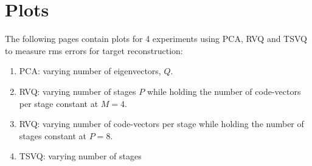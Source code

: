 \newpage
\appendix 
\section{Plots}
The following pages contain plots for 4 experiments using PCA, RVQ and TSVQ to measure rms errors for target reconstruction:

\begin{enumerate}
\item PCA: varying number of eigenvectors, $Q$.
\item RVQ: varying number of stages $P$ while holding the number of code-vectors per stage constant at $M=4$.
\item RVQ: varying number of code-vectors per stage while holding the number of stages constant at $P=8$.
\item TSVQ: varying number of stages
\end{enumerate}

\newpage
